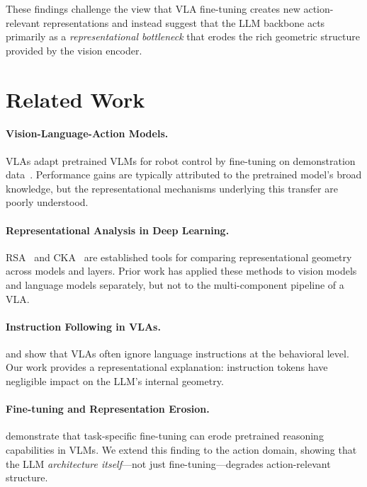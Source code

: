 \documentclass[10pt,letterpaper]{article}
\begin{document}
These findings challenge the view that VLA fine-tuning creates new action-relevant representations and instead suggest that the LLM backbone acts primarily as a \emph{representational bottleneck} that erodes the rich geometric structure provided by the vision encoder.


\section{Related Work}
\label{sec:related}

\paragraph{Vision-Language-Action Models.}
VLAs adapt pretrained VLMs for robot control by fine-tuning on demonstration data~\citep{kim2024openvla, brohan2023rt2}.
Performance gains are typically attributed to the pretrained model's broad knowledge, but the representational mechanisms underlying this transfer are poorly understood.

\paragraph{Representational Analysis in Deep Learning.}
RSA~\citep{kriegeskorte2008rsa} and CKA~\citep{kornblith2019cka} are established tools for comparing representational geometry across models and layers.
Prior work has applied these methods to vision models and language models separately, but not to the multi-component pipeline of a VLA.

\paragraph{Instruction Following in VLAs.}
\citet{hou2026langgap} and \citet{fei2025liberoplus} show that VLAs often ignore language instructions at the behavioral level.
Our work provides a representational explanation: instruction tokens have negligible impact on the LLM's internal geometry.

\paragraph{Fine-tuning and Representation Erosion.}
\citet{fang2025erosion} demonstrate that task-specific fine-tuning can erode pretrained reasoning capabilities in VLMs.
We extend this finding to the action domain, showing that the LLM \emph{architecture itself}---not just fine-tuning---degrades action-relevant structure.
\end{document}
